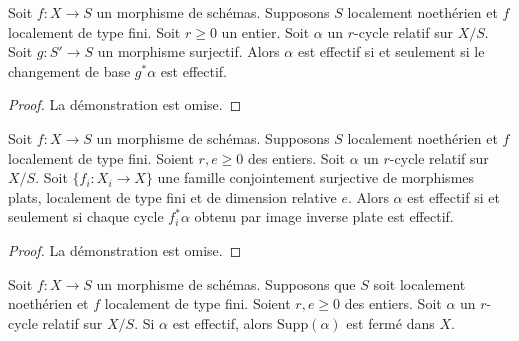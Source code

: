 \begin{lemma} 
\label{lemma-effective-descent} 
Soit $f : X \to S$ un morphisme de schémas. Supposons $S$ localement noethérien
 et $f$ localement de type fini. Soit $r \geq 0$ un entier. Soit $\alpha$
 un $r$-cycle relatif sur $X/S$. Soit $g : S' \to S$ un morphisme surjectif. 
Alors $\alpha$ est effectif si et seulement si le changement de base $g^*\alpha$
 est effectif. 
\end{lemma} 

\begin{proof} La 
démonstration est omise. 
\end{proof} 

\begin{lemma} 
\label{lemma-effective-descent-pullbacks} 
Soit $f : X \to S$ un morphisme de schémas. Supposons $S$ localement noethérien
 et $f$ localement de type fini. Soient $r, e \geq 0$ des entiers. 
Soit $\alpha$ un $r$-cycle relatif sur $X/S$.
 Soit $\{f_i : X_i \to X\}$ une famille conjointement surjective
 de morphismes plats, localement de type fini et de dimension relative $e$.
 Alors $\alpha$ est effectif si et seulement si chaque
 cycle $f_i^*\alpha$ obtenu par image inverse plate est effectif. 
\end{lemma} 

\begin{proof} La 
démonstration est omise. 
\end{proof} 

\begin{lemma} 
\label{lemma-effective-support-closed} 
Soit  $f : X \to S$  un morphisme de schémas. Supposons que  $S$  soit localement noethérien
 et  $f$  localement de type fini. Soient  $r, e \geq 0$ des entiers. 
Soit  $\alpha$  un  $r$-cycle relatif sur  $X/S$.
 Si $\alpha$  est effectif, alors  $\text{Supp}(\alpha)$  est
 fermé dans  $X$. 
\end{lemma} 

